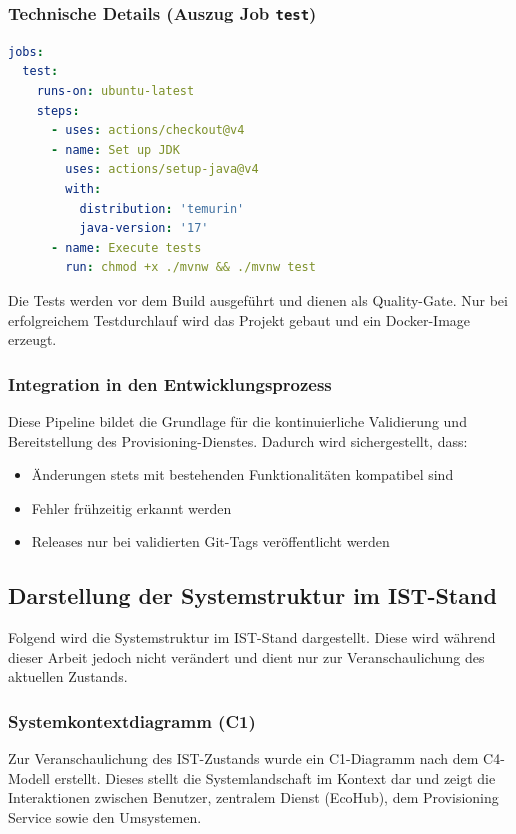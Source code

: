 \subsubsection*{Technische Details (Auszug Job \texttt{test})}

\begin{lstlisting}[language=yaml, caption={Auszug aus pipeline.yml}]
jobs:
  test:
    runs-on: ubuntu-latest
    steps:
      - uses: actions/checkout@v4
      - name: Set up JDK
        uses: actions/setup-java@v4
        with:
          distribution: 'temurin'
          java-version: '17'
      - name: Execute tests
        run: chmod +x ./mvnw && ./mvnw test
\end{lstlisting}

Die Tests werden vor dem Build ausgeführt und dienen als Quality-Gate. Nur bei erfolgreichem Testdurchlauf wird das Projekt gebaut und ein Docker-Image erzeugt.

\subsubsection*{Integration in den Entwicklungsprozess}

Diese Pipeline bildet die Grundlage für die kontinuierliche Validierung und Bereitstellung des Provisioning-Dienstes. Dadurch wird sichergestellt, dass:

\begin{itemize}
  \item Änderungen stets mit bestehenden Funktionalitäten kompatibel sind
  \item Fehler frühzeitig erkannt werden
  \item Releases nur bei validierten Git-Tags veröffentlicht werden
\end{itemize}


\subsection{Darstellung der Systemstruktur im IST-Stand}
Folgend wird die Systemstruktur im IST-Stand dargestellt. Diese wird während dieser Arbeit jedoch nicht verändert und dient nur zur Veranschaulichung des aktuellen Zustands.
\subsubsection*{Systemkontextdiagramm (C1)}  
Zur Veranschaulichung des IST-Zustands wurde ein C1-Diagramm nach dem C4-Modell erstellt. Dieses stellt die Systemlandschaft im Kontext dar und zeigt die Interaktionen zwischen Benutzer, zentralem Dienst (EcoHub), dem Provisioning Service sowie den Umsystemen.

